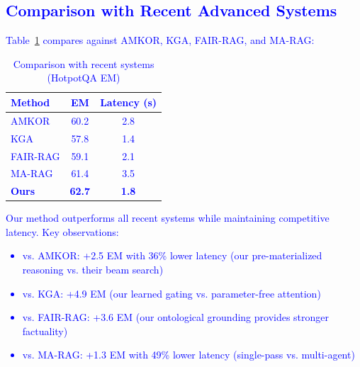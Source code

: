 \documentclass[10pt,twocolumn]{article}
\newcommand{\revision}[1]{\textcolor{blue}{#1}}
\begin{document}
\revision{
\subsection{Comparison with Recent Advanced Systems}
\label{sec:recent_comparisons}

Table~\ref{tab:recent_results} compares against AMKOR, KGA, FAIR-RAG, and MA-RAG:

\begin{table}[t]
\centering
\caption{Comparison with recent systems (HotpotQA EM)}
\label{tab:recent_results}
\small
\begin{tabular}{@{}lcc@{}}
\toprule
\textbf{Method} & \textbf{EM} & \textbf{Latency (s)} \\
\midrule
AMKOR \cite{fang2024amkor} & 60.2 & 2.8 \\
KGA \cite{wang2024kga} & 57.8 & 1.4 \\
FAIR-RAG \cite{chen2024fairrag} & 59.1 & 2.1 \\
MA-RAG \cite{li2024marag} & 61.4 & 3.5 \\
\midrule
\textbf{Ours} & \textbf{62.7} & \textbf{1.8} \\
\bottomrule
\end{tabular}
\end{table}

Our method outperforms all recent systems while maintaining competitive latency. Key observations:
\begin{itemize}
    \item vs. AMKOR: +2.5 EM with 36\% lower latency (our pre-materialized reasoning vs. their beam search)
    \item vs. KGA: +4.9 EM (our learned gating vs. parameter-free attention)
    \item vs. FAIR-RAG: +3.6 EM (our ontological grounding provides stronger factuality)
    \item vs. MA-RAG: +1.3 EM with 49\% lower latency (single-pass vs. multi-agent)
\end{itemize}
}
\end{document}
